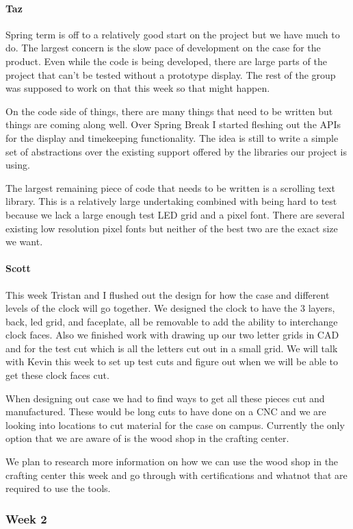 \documentclass[onecolumn, draftclsnofoot,10pt, compsoc]{IEEEtran}
\begin{document}
\paragraph{Taz}
Spring term is off to a relatively good start on the project but we have much to do. The largest concern is the slow pace of development on the case for the product. Even while the code is being developed, there are large parts of the project that can't be tested without a prototype display. The rest of the group was supposed to work on that this week so that might happen.

On the code side of things, there are many things that need to be written but things are coming along well. Over Spring Break I started fleshing out the APIs for the display and timekeeping functionality. The idea is still to write a simple set of abstractions over the existing support offered by the libraries our project is using.

The largest remaining piece of code that needs to be written is a scrolling text library. This is a relatively large undertaking combined with being hard to test because we lack a large enough test LED grid and a pixel font. There are several existing low resolution pixel fonts but neither of the best two are the exact size we want.
\paragraph{Scott}
This week Tristan and I flushed out the design for how the case and different levels of the clock will go together. We designed the clock to have the 3 layers, back, led grid, and faceplate, all be removable to add the ability to interchange clock faces. Also we finished work with drawing up our two letter grids in CAD and for the test cut which is all the letters cut out in a small grid. We will talk with Kevin this week to set up test cuts and figure out when we will be able to get these clock faces cut.

When designing out case we had to find ways to get all these pieces cut and manufactured. These would be long cuts to have done on a CNC and we are looking into locations to cut material for the case on campus. Currently the only option that we are aware of is the wood shop in the crafting center.

We plan to research more information on how we can use the wood shop in the crafting center this week and go through with certifications and whatnot that are required to use the tools.
\subsubsection{Week 2}
\end{document}
